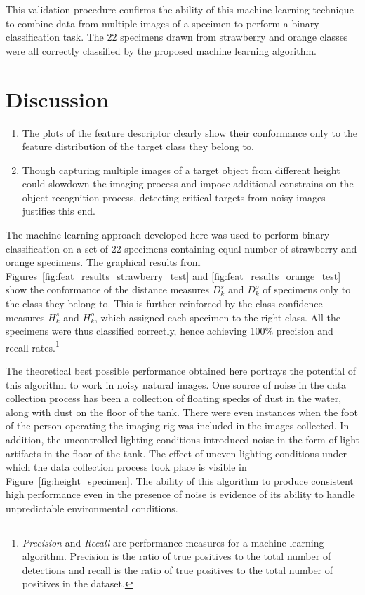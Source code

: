 \documentclass {udthesis}
\begin{document}
This validation procedure confirms the ability of this machine learning technique to combine data from multiple images of a specimen to perform a binary classification task. The 22 specimens drawn from strawberry and orange classes were all correctly classified by the proposed machine learning algorithm.

\section{Discussion}
\begin{enumerate}
	\item The plots of the feature descriptor clearly show their conformance only to the feature distribution of the target class they belong to.
	
	\item Though capturing multiple images of a target object from different height could slowdown the imaging process and impose additional constrains on the object recognition process, detecting critical targets from noisy images justifies this end.
\end{enumerate}

The machine learning approach developed here was used to perform binary classification on a set of 22 specimens containing equal number of strawberry and orange specimens. The graphical results from Figures~\ref{fig:feat_results_strawberry_test} and \ref{fig:feat_results_orange_test} show the conformance of the distance measures $D^s_k$ and $D^o_k$ of specimens only to the class they belong to. This is further reinforced by the class confidence measures $H^s_k$ and $H^o_k$, which assigned each specimen to the right class. All the specimens were thus classified correctly, hence achieving 100\% precision and recall rates.\footnote{\emph{Precision} and \emph{Recall} are performance measures for a machine learning algorithm. Precision is the ratio of true positives to the total number of detections and recall is the ratio of true positives to the total number of positives in the dataset.} 

The theoretical best possible performance obtained here portrays the potential of this algorithm to work in noisy natural images. One source of noise in the data collection process has been a collection of floating specks of dust in the water, along with dust on the floor of the tank. There were even instances when the foot of the person operating the imaging-rig was included in the images collected. In addition, the uncontrolled lighting conditions introduced noise in the form of light artifacts in the floor of the tank. The effect of uneven lighting conditions under which the data collection process took place is visible in Figure~\ref{fig:height_specimen}. The ability of this algorithm to produce consistent high performance even in the presence of noise is evidence of its ability to handle unpredictable environmental conditions.
\end{document}
